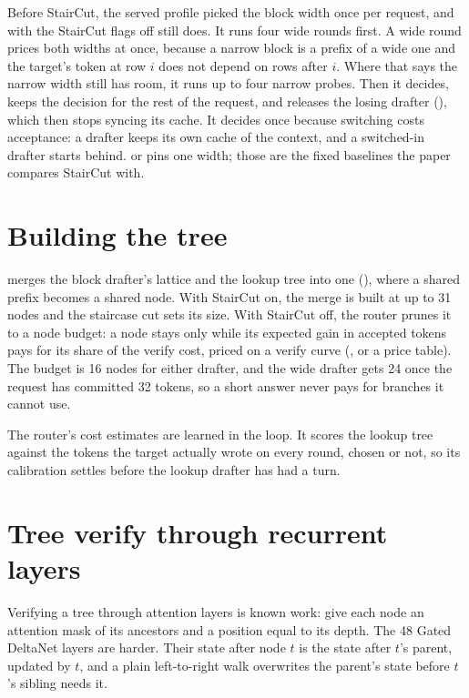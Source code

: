 Before StairCut, the served profile picked the block width once per request, and with the StairCut flags off  still does. It runs four wide rounds first. A wide round prices both widths at once, because a narrow block is a prefix of a wide one and the target's token at row $i$ does not depend on rows after $i$. Where that says the narrow width still has room, it runs up to four narrow probes. Then it decides, keeps the decision for the rest of the request, and releases the losing drafter (), which then stops syncing its cache. It decides once because switching costs acceptance: a drafter keeps its own cache of the context, and a switched-in drafter starts behind.  or  pins one width; those are the fixed baselines the paper compares StairCut with.

\section{Building the tree}

 merges the block drafter's lattice and the lookup tree into one  (), where a shared prefix becomes a shared node. With StairCut on, the merge is built at up to 31 nodes and the staircase cut sets its size. With StairCut off, the router prunes it to a node budget: a node stays only while its expected gain in accepted tokens pays for its share of the verify cost, priced on a verify curve (, or a price table). The budget is 16 nodes for either drafter, and the wide drafter gets 24 once the request has committed 32 tokens, so a short answer never pays for branches it cannot use.

The router's cost estimates are learned in the loop. It scores the lookup tree against the tokens the target actually wrote on every round, chosen or not, so its calibration settles before the lookup drafter has had a turn.

\section{Tree verify through recurrent layers}

Verifying a tree through attention layers is known work: give each node an attention mask of its ancestors and a position equal to its depth. The 48 Gated DeltaNet layers are harder. Their state after node $t$ is the state after $t$'s parent, updated by $t$, and a plain left-to-right walk overwrites the parent's state before $t$'s sibling needs it.

